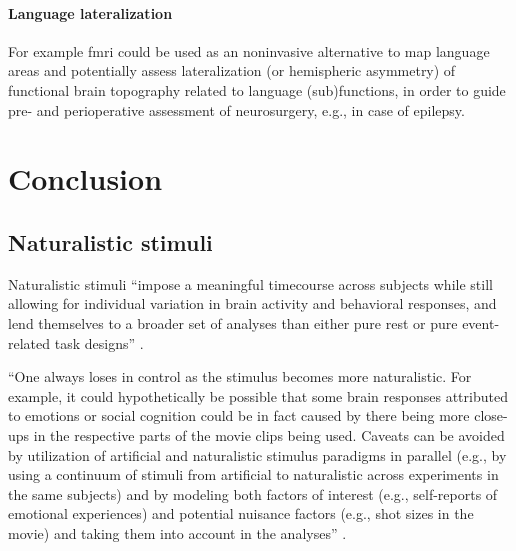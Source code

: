 \paragraph{Language lateralization}



%
For example \ac{fmri} could be used as an noninvasive alternative to map
language areas and potentially assess lateralization (or hemispheric asymmetry)
of functional brain topography related to language (sub)functions, in order to
guide pre- and perioperative assessment of neurosurgery, e.g., in case of
epilepsy.





\section{Conclusion}

\subsection{Naturalistic stimuli}

%
Naturalistic stimuli ``impose a meaningful timecourse across subjects while
still allowing for individual variation in brain activity and behavioral
responses, and lend themselves to a broader set of analyses than either pure
rest or pure event-related task designs'' \citep[][p. 142]{finn2017can}.

%
``One always loses in control as the stimulus becomes more naturalistic.
%
For example, it could hypothetically be possible that some brain responses
attributed to emotions or social cognition could be in fact caused by there
being more close-ups in the respective parts of the movie clips being used.
%
Caveats can be avoided by utilization of artificial and naturalistic stimulus
paradigms in parallel (e.g., by using a continuum of stimuli from artificial to
naturalistic across experiments in the same subjects) and by modeling both
factors of interest (e.g., self-reports of emotional experiences) and potential
nuisance factors (e.g., shot sizes in the movie) and taking them into account in
the analyses'' \citep{jaaskelainen2021movies}.

